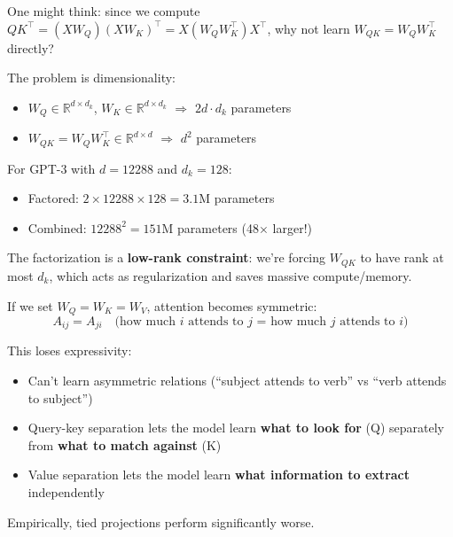 \begin{remark}
    One might think: since we compute $QK^\top = (XW_Q)(XW_K)^\top = X(W_Q W_K^\top)X^\top$, why not learn $W_{QK} = W_Q W_K^\top$ directly?

    The problem is dimensionality:
    \begin{itemize}
        \item $W_Q \in \mathbb{R}^{d \times d_k}$, $W_K \in \mathbb{R}^{d \times d_k}$ $\Rightarrow$ $2 d \cdot d_k$ parameters
        \item $W_{QK} = W_Q W_K^\top \in \mathbb{R}^{d \times d}$ $\Rightarrow$ $d^2$ parameters
    \end{itemize}

    For GPT-3 with $d = 12288$ and $d_k = 128$:
    \begin{itemize}
        \item Factored: $2 \times 12288 \times 128 = 3.1$M parameters
        \item Combined: $12288^2 = 151$M parameters (48$\times$ larger!)
    \end{itemize}

    The factorization is a \textbf{low-rank constraint}: we're forcing $W_{QK}$ to have rank at most $d_k$, which acts as regularization and saves massive compute/memory.
\end{remark}

\begin{remark}[Why Not $Q = K = V$?]
    If we set $W_Q = W_K = W_V$, attention becomes symmetric:
    \[
        A_{ij} = A_{ji} \quad \text{(how much $i$ attends to $j$ = how much $j$ attends to $i$)}
    \]

    This loses expressivity:
    \begin{itemize}
        \item Can't learn asymmetric relations (``subject attends to verb'' vs ``verb attends to subject'')
        \item Query-key separation lets the model learn \textbf{what to look for} (Q) separately from \textbf{what to match against} (K)
        \item Value separation lets the model learn \textbf{what information to extract} independently
    \end{itemize}

    Empirically, tied projections perform significantly worse.
\end{remark}

